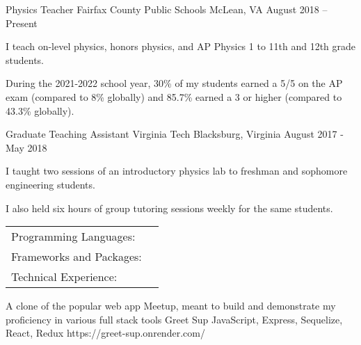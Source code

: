 \documentclass[]{awesome-cv}
\begin{document}
\begin{cventries}
	\cventry
	{Physics Teacher}
	{Fairfax County Public Schools}
	{McLean, VA}
	{August 2018 – Present}
	{\begin{cvitems}
		\item {I teach on-level physics, honors physics, and AP Physics 1 to 11th and 12th grade students.}
		\item {During the 2021-2022 school year, 30\% of my students earned a 5/5 on the AP exam (compared to 8\% globally) and 85.7\% earned a 3 or higher (compared to 43.3\% globally).}
		\end{cvitems}}
	\cventry
	{Graduate Teaching Assistant}
	{Virginia Tech}
	{Blacksburg, Virginia}
	{August 2017 - May 2018}
	{\begin{cvitems}
		\item {I taught two sessions of an introductory physics lab to freshman and sophomore engineering students.}
		\item {I also held six hours of group tutoring sessions weekly for the same students.}
		\end{cvitems}}
\end{cventries}
\begin{cventries}
	\cventry
	{}
	{\def\arraystretch{1.15}{\begin{tabular}{ l l }
		Programming Languages:  & {\skill{ JS and Python -- proficient; Java and C -- novice}} \\
		Frameworks and Packages:  & {\skill{ Express, React/Redux, Sequelize, Flask}} \\
		Technical Experience: & {\skill{Linux and Linux command line}}\\
		\end{tabular}}}
	{}
	{}
	{}
\end{cventries}
\vspace{-7mm}
\begin{cventries}
	\cventry
	{A clone of the popular web app Meetup, meant to build and demonstrate my proficiency in various full stack tools}
	{Greet Sup}
	{JavaScript, Express, Sequelize, React, Redux}
	{https://greet-sup.onrender.com/}
	{}
	\vspace{-5mm}
\end{cventries}
\ 
\end{document}
